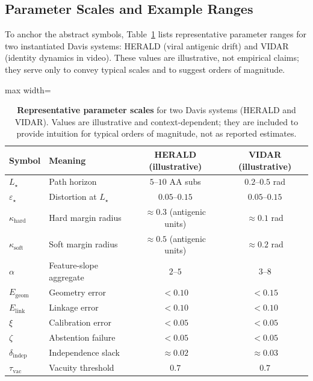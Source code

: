 \documentclass[11pt]{article}
\begin{document}
\subsection{Parameter Scales and Example Ranges}
\label{subsec:param-table}

To anchor the abstract symbols, Table~\ref{tab:params} lists representative parameter
ranges for two instantiated Davis systems: HERALD (viral antigenic drift) and VIDAR
(identity dynamics in video). These values are illustrative, not empirical claims; they
serve only to convey typical scales and to suggest orders of magnitude.

\begin{table}[t]
    \centering
    \begin{adjustbox}{max width=\linewidth}
    \begin{tabular}{llcc}
        \toprule
        Symbol & Meaning & HERALD (illustrative) & VIDAR (illustrative) \\
        \midrule
        $L_\star$ & Path horizon & $5$--$10$ AA subs & $0.2$--$0.5$ rad \\
        $\varepsilon_\star$ & Distortion at $L_\star$ & $0.05$--$0.15$ & $0.05$--$0.15$ \\
        $\kappa_{\mathrm{hard}}$ & Hard margin radius & $\approx 0.3$ (antigenic units) & $\approx 0.1$ rad \\
        $\kappa_{\mathrm{soft}}$ & Soft margin radius & $\approx 0.5$ (antigenic units) & $\approx 0.2$ rad \\
        $\alpha$ & Feature-slope aggregate & $2$--$5$ & $3$--$8$ \\
        $E_{\text{geom}}$ & Geometry error & $< 0.10$ & $< 0.15$ \\
        $E_{\text{link}}$ & Linkage error & $< 0.10$ & $< 0.10$ \\
        $\xi$ & Calibration error & $< 0.05$ & $< 0.05$ \\
        $\zeta$ & Abstention failure & $< 0.05$ & $< 0.05$ \\
        $\delta_{\text{indep}}$ & Independence slack & $\approx 0.02$ & $\approx 0.03$ \\
        $\tau_{\text{vac}}$ & Vacuity threshold & $0.7$ & $0.7$ \\
        \bottomrule
    \end{tabular}
    \end{adjustbox}
    \caption{\textbf{Representative parameter scales} for two Davis systems (HERALD and VIDAR).
    Values are illustrative and context-dependent; they are included to provide intuition for
    typical orders of magnitude, not as reported estimates.}
    \label{tab:params}
\end{table}
\end{document}
